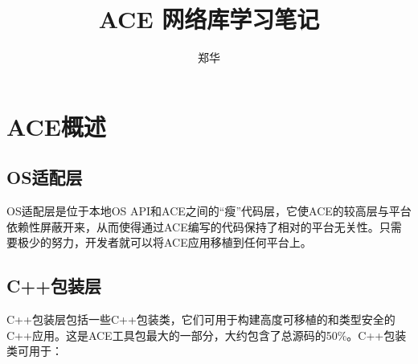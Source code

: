 \documentclass[UTF8,a4paper,12pt]{ctexbook}
\author{\kaishu 郑华}
\title{\heiti ACE 网络库学习笔记}
\begin{document}
 	\maketitle
	\tableofcontents
\chapter{ACE概述}
	\section{OS适配层}
		OS适配层是位于本地OS API和ACE之间的“瘦”代码层，它使ACE的较高层与平台依赖性屏蔽开来，从而使得通过ACE编写的代码保持了相对的平台无关性。只需要极少的努力，开发者就可以将ACE应用移植到任何平台上。
		
	\section{C++包装层}
		C++包装层包括一些C++包装类，它们可用于构建高度可移植的和类型安全的C++应用。这是ACE工具包最大的一部分，大约包含了总源码的50\%。C++包装类可用于：
		
\end{document}

